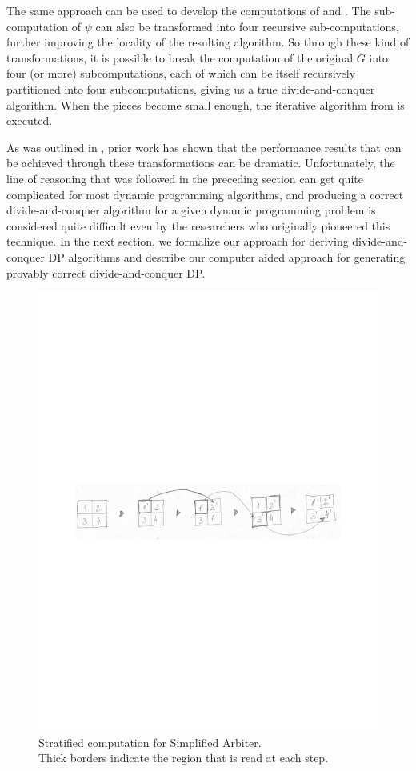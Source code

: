 The same approach can be used to develop the computations of  and .
The sub-computation of $\psi$ can also be transformed into four recursive sub-computations, further improving the locality of the resulting algorithm.
So through these kind of transformations, it is possible to break the computation of the original $G$ into four (or more) subcomputations, each of which can be itself recursively partitioned into four subcomputations, giving us a true divide-and-conquer algorithm.
When the pieces become small enough, the iterative algorithm from  is executed.

As was outlined in , prior work has shown that the performance results that can be achieved through these transformations can be dramatic. Unfortunately, the line of reasoning that was followed in the preceding section can get quite complicated for most dynamic programming algorithms, and producing a correct divide-and-conquer algorithm for a given dynamic programming problem is considered quite difficult even by the researchers who originally pioneered this technique. In the next section, we formalize our approach for deriving divide-and-conquer DP algorithms and describe our computer aided approach for generating provably correct divide-and-conquer DP.


\begin{figure}
\includegraphics[width=.47\textwidth]{img/gap-stratify1}
\caption[caption]{\label{intro:chain}
  Stratified computation for Simplified Arbiter. \\[.2em]
  Thick borders indicate the region that is read at each step.}
\end{figure}


